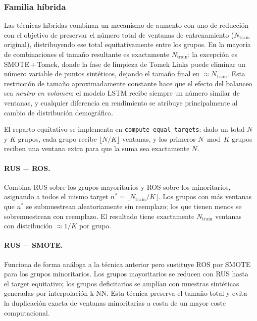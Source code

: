 \subsubsection{Familia híbrida}
\label{subsubsec:familia_hibrida}

Las técnicas híbridas combinan un mecanismo de aumento con uno de reducción con el
objetivo de preservar el número total de ventanas de entrenamiento ($N_\text{train}$
original), distribuyendo ese total equitativamente entre los grupos. En la mayoría de
combinaciones el tamaño resultante es exactamente $N_\text{train}$; la excepción es
SMOTE\,+\,Tomek, donde la fase de limpieza de Tomek Links puede eliminar un número
variable de puntos sintéticos, dejando el tamaño final en $\approx N_\text{train}$.
Esta restricción de tamaño aproximadamente constante hace que el efecto del balanceo sea
\emph{neutro en volumen}: el modelo LSTM recibe siempre un número similar de ventanas,
y cualquier diferencia en rendimiento se atribuye principalmente al cambio de distribución
demográfica.

El reparto equitativo se implementa en \texttt{compute\_equal\_targets}: dado un total
$N$ y $K$ grupos, cada grupo recibe $\lfloor N/K \rfloor$ ventanas, y los primeros
$N \bmod K$ grupos reciben una ventana extra para que la suma sea exactamente $N$.

\paragraph{RUS + ROS.}
Combina RUS sobre los grupos mayoritarios y ROS sobre los minoritarios, asignando a todos el mismo target $n^* = \lfloor N_\text{train} / K \rfloor$. Los grupos con más ventanas que $n^*$ se submuestrean aleatoriamente sin reemplazo; los que tienen menos se sobremuestrean con reemplazo. El resultado tiene exactamente $N_\text{train}$ ventanas con distribución $\approx 1/K$ por grupo.

\paragraph{RUS + SMOTE.}
Funciona de forma análoga a la técnica anterior pero sustituye ROS por SMOTE para los grupos minoritarios. Los grupos mayoritarios se reducen con RUS hasta el target equitativo; los grupos deficitarios se amplían con muestras sintéticas generadas por interpolación k-NN. Esta técnica preserva el tamaño total y evita la duplicación exacta de ventanas minoritarias a costa de un mayor coste computacional.

